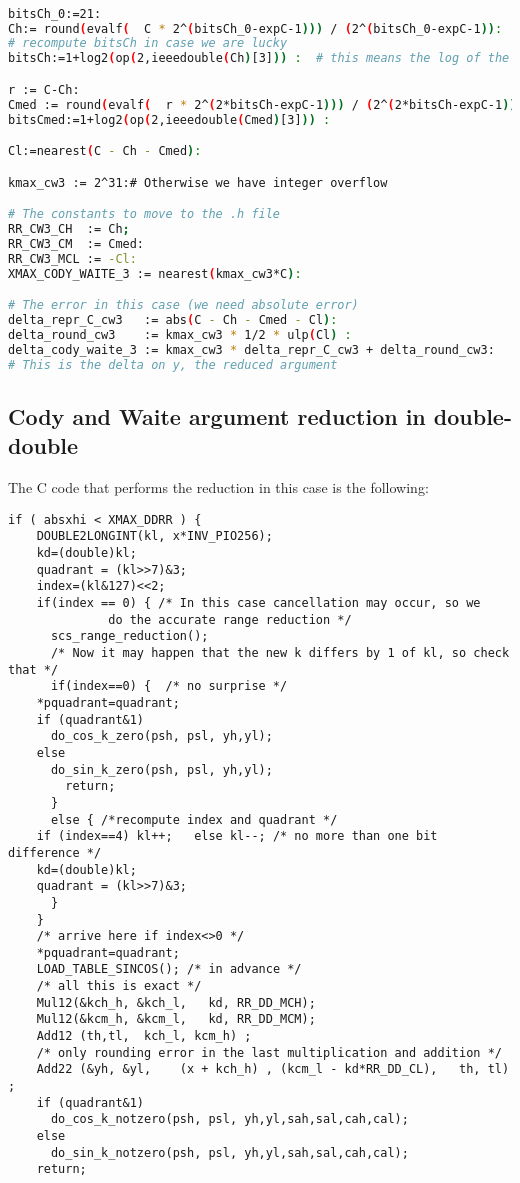 \begin{lstlisting}[caption={Computing constants for Cody and Waite 3},
  firstnumber=1,  language={sh}]% of course it's maple
%Skip a line here, I don't know why, otherwise latex eats the first line

bitsCh_0:=21:
Ch:= round(evalf(  C * 2^(bitsCh_0-expC-1))) / (2^(bitsCh_0-expC-1)):
# recompute bitsCh in case we are lucky
bitsCh:=1+log2(op(2,ieeedouble(Ch)[3])) :  # this means the log of the denominator

r := C-Ch:
Cmed := round(evalf(  r * 2^(2*bitsCh-expC-1))) / (2^(2*bitsCh-expC-1)):
bitsCmed:=1+log2(op(2,ieeedouble(Cmed)[3])) :

Cl:=nearest(C - Ch - Cmed):

kmax_cw3 := 2^31:# Otherwise we have integer overflow

# The constants to move to the .h file
RR_CW3_CH  := Ch;
RR_CW3_CM  := Cmed:
RR_CW3_MCL := -Cl:
XMAX_CODY_WAITE_3 := nearest(kmax_cw3*C):

# The error in this case (we need absolute error)
delta_repr_C_cw3   := abs(C - Ch - Cmed - Cl):
delta_round_cw3    := kmax_cw3 * 1/2 * ulp(Cl) :
delta_cody_waite_3 := kmax_cw3 * delta_repr_C_cw3 + delta_round_cw3:
# This is the delta on y, the reduced argument
\end{lstlisting}

\subsection{Cody and Waite argument reduction in double-double}
The C code that performs the reduction in this case is the following:

\begin{lstlisting}[caption={Cody and Waite argument reduction in
    double-double},firstnumber=1]
  if ( absxhi < XMAX_DDRR ) {
    DOUBLE2LONGINT(kl, x*INV_PIO256);
    kd=(double)kl;
    quadrant = (kl>>7)&3;
    index=(kl&127)<<2;
    if(index == 0) { /* In this case cancellation may occur, so we
			  do the accurate range reduction */
      scs_range_reduction(); 
      /* Now it may happen that the new k differs by 1 of kl, so check that */
      if(index==0) {  /* no surprise */
	*pquadrant=quadrant;
	if (quadrant&1)
	  do_cos_k_zero(psh, psl, yh,yl);
	else 
	  do_sin_k_zero(psh, psl, yh,yl);
      	return;
      }
      else { /*recompute index and quadrant */
	if (index==4) kl++;   else kl--; /* no more than one bit difference */
	kd=(double)kl;
	quadrant = (kl>>7)&3;
      }
    }
    /* arrive here if index<>0 */
    *pquadrant=quadrant;
    LOAD_TABLE_SINCOS(); /* in advance */
    /* all this is exact */
    Mul12(&kch_h, &kch_l,   kd, RR_DD_MCH);
    Mul12(&kcm_h, &kcm_l,   kd, RR_DD_MCM);
    Add12 (th,tl,  kch_l, kcm_h) ;
    /* only rounding error in the last multiplication and addition */ 
    Add22 (&yh, &yl,    (x + kch_h) , (kcm_l - kd*RR_DD_CL),   th, tl) ;
    if (quadrant&1)
      do_cos_k_notzero(psh, psl, yh,yl,sah,sal,cah,cal);
    else 
      do_sin_k_notzero(psh, psl, yh,yl,sah,sal,cah,cal);
    return;
\end{lstlisting}


